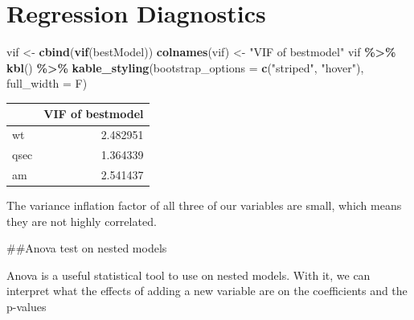 \documentclass[
]{article}
\newenvironment{Shaded}{\begin{snugshade}}{\end{snugshade}}
\newcommand{\AttributeTok}[1]{\textcolor[rgb]{0.13,0.29,0.53}{#1}}
\newcommand{\FunctionTok}[1]{\textcolor[rgb]{0.13,0.29,0.53}{\textbf{#1}}}
\newcommand{\NormalTok}[1]{#1}
\newcommand{\OtherTok}[1]{\textcolor[rgb]{0.56,0.35,0.01}{#1}}
\newcommand{\SpecialCharTok}[1]{\textcolor[rgb]{0.81,0.36,0.00}{\textbf{#1}}}
\newcommand{\StringTok}[1]{\textcolor[rgb]{0.31,0.60,0.02}{#1}}
\begin{document}
\section{Regression Diagnostics}\label{regression-diagnostics}

\begin{Shaded}
\begin{Highlighting}[]
\NormalTok{vif }\OtherTok{\textless{}{-}} \FunctionTok{cbind}\NormalTok{(}\FunctionTok{vif}\NormalTok{(bestModel))}
\FunctionTok{colnames}\NormalTok{(vif) }\OtherTok{\textless{}{-}} \StringTok{"VIF of bestmodel"}
\NormalTok{vif  }\SpecialCharTok{\%\textgreater{}\%}
  \FunctionTok{kbl}\NormalTok{() }\SpecialCharTok{\%\textgreater{}\%}
  \FunctionTok{kable\_styling}\NormalTok{(}\AttributeTok{bootstrap\_options =} \FunctionTok{c}\NormalTok{(}\StringTok{"striped"}\NormalTok{, }\StringTok{"hover"}\NormalTok{), }\AttributeTok{full\_width =}\NormalTok{ F)}
\end{Highlighting}
\end{Shaded}

\begin{table}
\centering
\begin{tabular}[t]{l|r}
\hline
  & VIF of bestmodel\\
\hline
wt & 2.482951\\
\hline
qsec & 1.364339\\
\hline
am & 2.541437\\
\hline
\end{tabular}
\end{table}

The variance inflation factor of all three of our variables are small,
which means they are not highly correlated.

\#\#Anova test on nested models

Anova is a useful statistical tool to use on nested models. With it, we
can interpret what the effects of adding a new variable are on the
coefficients and the p-values
\end{document}
